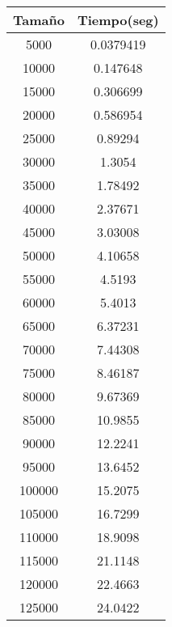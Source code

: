 \begin{longtable}{|c|c|}
\hline
\textbf{Tamaño} & \textbf{Tiempo(seg)} \\ \hline
5000   & 0.0379419   \\ \hline
10000  & 0.147648    \\ \hline
15000  & 0.306699    \\ \hline
20000  & 0.586954    \\ \hline
25000  & 0.89294     \\ \hline
30000  & 1.3054      \\ \hline
35000  & 1.78492     \\ \hline
40000  & 2.37671     \\ \hline
45000  & 3.03008     \\ \hline
50000  & 4.10658     \\ \hline
55000  & 4.5193      \\ \hline
60000  & 5.4013      \\ \hline
65000  & 6.37231     \\ \hline
70000  & 7.44308     \\ \hline
75000  & 8.46187     \\ \hline
80000  & 9.67369     \\ \hline
85000  & 10.9855     \\ \hline
90000  & 12.2241     \\ \hline
95000  & 13.6452     \\ \hline
100000 & 15.2075     \\ \hline
105000 & 16.7299     \\ \hline
110000 & 18.9098     \\ \hline
115000 & 21.1148     \\ \hline
120000 & 22.4663     \\ \hline
125000 & 24.0422     \\ \hline
\end{longtable}
